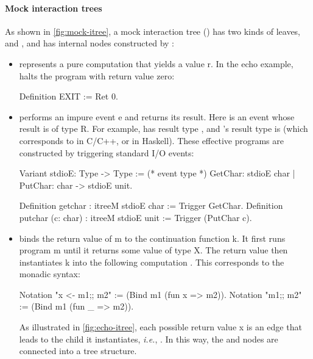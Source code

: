 \paragraph{Mock interaction trees}
As shown in \autoref{fig:mock-itree}, a mock interaction tree () has
two kinds of leaves,  and , and has internal nodes
constructed by :
\begin{itemize}
\item {} represents a pure computation that yields a value \ilc r.
  In the echo example,  halts the program with return value zero:
\begin{coq}
  Definition EXIT := Ret 0.
\end{coq}

\item {} performs an impure event \ilc e and returns its result.
  Here  is an event whose result is of type \ilc R.  For example,
   has result type , and 's result type is
   (which corresponds to  in C/C++, or \ilc{()} in
  Haskell).  These effective programs are constructed by triggering standard I/O
  events:
\begin{coq}
  Variant stdioE: Type -> Type := (* event type *)
    GetChar:         stdioE char
  | PutChar: char -> stdioE unit.
  
  Definition getchar           : itreeM stdioE char := Trigger  GetChar.
  Definition putchar (c: char) : itreeM stdioE unit := Trigger (PutChar c).
\end{coq}
\item {} binds the return value of \ilc m to the continuation
  function \ilc k.  It first runs program \ilc m until it returns some value of
  type \ilc X.  The return value  then instantiates \ilc k into the
  following computation .  This corresponds to the
  monadic \ilc{(;;)} syntax:
\begin{coq}
  Notation "x <- m1;; m2" := (Bind m1 (fun x => m2)).
  Notation "m1;; m2"      := (Bind m1 (fun _ => m2)).
\end{coq}

As illustrated in \autoref{fig:echo-itree}, each possible return value \ilc x is
an edge that leads to the child it instantiates, {\it i.e.}, .  In this
way, the  and  nodes are connected into a tree
structure.
\end{itemize}

